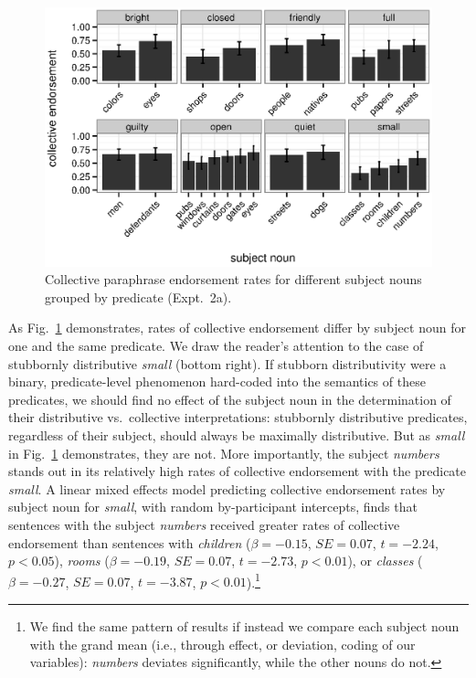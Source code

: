 \documentclass[linguex]{sp}
\begin{document}
\begin{figure}[h!]
	\centering
	\includegraphics[width=.85\linewidth]{plots/noun_pred_plot2.eps}
	\caption{Collective paraphrase endorsement rates for different subject nouns grouped by predicate (Expt.~2a).} \label{noun-pred-coll}
\end{figure}

As Fig.~\ref{noun-pred-coll} demonstrates, rates of collective endorsement differ by subject noun for one and the same predicate. We draw the reader's attention to the case of stubbornly distributive \emph{small} (bottom right). 
If stubborn distributivity were a binary, predicate-level phenomenon hard-coded into the semantics of these predicates, we should find no effect of the subject noun in the determination of their distributive vs.~collective interpretations: stubbornly distributive predicates, regardless of their subject, should always be maximally distributive. But as \emph{small} in Fig.~\ref{noun-pred-coll} demonstrates, they are not. More importantly, the subject \emph{numbers} stands out in its relatively high rates of collective endorsement with the predicate \emph{small}. A linear mixed effects model predicting collective endorsement rates by subject noun for \emph{small}, with random by-participant intercepts, finds that sentences with the subject \emph{numbers} received greater rates of collective endorsement than sentences with \emph{children} ($\beta=-0.15$, $SE=0.07$, $t=-2.24$, $p<0.05$), \emph{rooms} ($\beta=-0.19$, $SE=0.07$, $t=-2.73$, $p<0.01$), or \emph{classes} ($\beta=-0.27$, $SE=0.07$, $t=-3.87$, $p<0.01$).\footnote{We find the same pattern of results if instead we compare each subject noun with the grand mean (i.e., through effect, or deviation, coding of our variables): \emph{numbers} deviates significantly, while the other nouns do not.}
\end{document}
